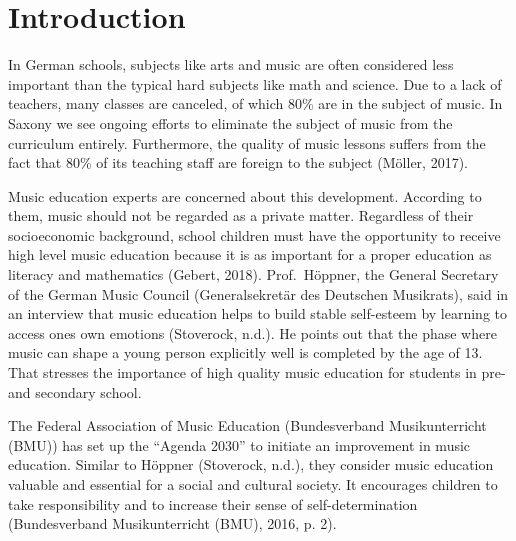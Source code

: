 \documentclass[a4, 12pt]{article}
\begin{document}
\hypertarget{introduction}{%
\section{Introduction}\label{introduction}}

\label{introduction}

In German schools, subjects like arts and music are often considered less important than the typical hard subjects like math and science. Due to a lack of teachers, many classes are canceled, of which 80\% are in the subject of music. In Saxony we see ongoing efforts to eliminate the subject of music from the curriculum entirely. Furthermore, the quality of music lessons suffers from the fact that 80\% of its teaching staff are foreign to the subject (Möller, 2017).

Music education experts are concerned about this development. According to them, music should not be regarded as a private matter. Regardless of their socioeconomic background, school children must have the opportunity to receive high level music education because it is as important for a proper education as literacy and mathematics (Gebert, 2018). Prof.~Höppner, the General Secretary of the German Music Council (Generalsekretär des Deutschen Musikrats), said in an interview that music education helps to build stable self-esteem by learning to access ones own emotions (Stoverock, n.d.). He points out that the phase where music can shape a young person explicitly well is completed by the age of 13. That stresses the importance of high quality music education for students in pre- and secondary school.

The Federal Association of Music Education (Bundesverband Musikunterricht (BMU)) has set up the ``Agenda 2030'' to initiate an improvement in music education. Similar to Höppner (Stoverock, n.d.), they consider music education valuable and essential for a social and cultural society. It encourages children to take responsibility and to increase their sense of self-determination (Bundesverband Musikunterricht (BMU), 2016, p. 2).
\end{document}
